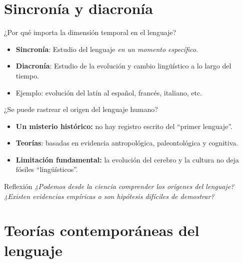 \documentclass[handout]{beamer}
\begin{document}
\section{Sincronía y diacronía}

\begin{frame}{¿Por qué importa la dimensión temporal en el lenguaje?}
  \begin{itemize}
    \item \textbf{Sincronía}: Estudio del lenguaje \textit{en un momento específico}.
    \item \textbf{Diacronía}: Estudio de la evolución y cambio lingüístico a lo largo del tiempo.
    \item Ejemplo: evolución del latín al español, francés, italiano, etc.
  \end{itemize}

  \vspace{5pt}
\end{frame}

\begin{frame}{¿Se puede rastrear el origen del lenguaje humano?}
  \begin{itemize}
    \item \textbf{Un misterio histórico:} no hay registro escrito del “primer lenguaje”.
    \item \textbf{Teorías}: basadas en evidencia antropológica, paleontológica y cognitiva.
    \item \textbf{Limitación fundamental:} la evolución del cerebro y la cultura no deja fósiles “lingüísticos”.
  \end{itemize}

  \begin{alertblock}{Reflexión}
    \textit{¿Podemos desde la ciencia comprender los orígenes del lenguaje? ¿Existen evidencias empíricas o son hipótesis difíciles de demostrar?}
  \end{alertblock}
\end{frame}

\section{Teorías contemporáneas del lenguaje}
\end{document}
